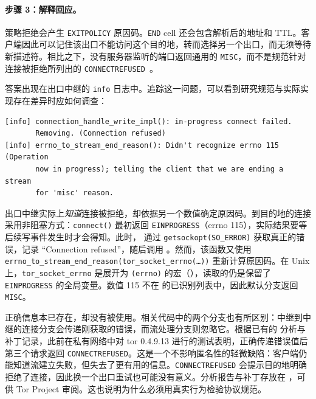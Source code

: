 \paragraph{步骤 3：解释回应。}策略拒绝会产生 \texttt{EXITPOLICY} 原因码。\texttt{END} cell 还会包含解析后的地址和 TTL。客户端因此可以记住该出口不能访问这个目的地，转而选择另一个出口，而无须等待新描述符。相比之下，没有服务器监听的端口返回通用的 \texttt{MISC}，而不是规范针对连接被拒绝所列出的 \texttt{CONNECTREFUSED}~。

\begin{approfondimento}
答案出现在出口中继的 \texttt{info} 日志中。追踪这一问题，可以看到研究规范与实际实现存在差异时应如何调查：
\begin{lstlisting}[numbers=none]
[info] connection_handle_write_impl(): in-progress connect failed.
       Removing. (Connection refused)
[info] errno_to_stream_end_reason(): Didn't recognize errno 115 (Operation
       now in progress); telling the client that we are ending a stream
       for 'misc' reason.
\end{lstlisting}
出口中继实际上\emph{知道}连接被拒绝，却依据另一个数值确定原因码。到目的地的连接采用非阻塞方式：\texttt{connect()} 最初返回 \texttt{EINPROGRESS}（errno 115），实际结果要等后续写事件发生时才会得知。此时， 通过 \texttt{getsockopt(SO\_ERROR)} 获取真正的错误，记录 \enquote{Connection refused}，随后调用 。然而，该函数又使用 \texttt{errno\_to\_stream\_end\_reason(tor\_socket\_errno(\ldots))} 重新计算原因码。在 Unix 上，\texttt{tor\_socket\_errno} 是展开为 \texttt{(errno)} 的宏（），读取的仍是保留了 \texttt{EINPROGRESS} 的全局变量。数值 115 不在  的已识别列表中，因此默认分支返回 \texttt{MISC}。

正确信息本已存在，却没有被使用。相关代码中的两个分支也有所区别：中继到中继的连接分支会传递刚获取的错误，而流处理分支则忽略它。根据已有的  分析与补丁记录，此前在私有网络中对 tor 0.4.9.13 进行的测试表明，正确传递错误值后第三个请求返回 \texttt{CONNECTREFUSED}。这是一个不影响匿名性的轻微缺陷：客户端仍能知道流建立失败，但失去了更有用的信息。\texttt{CONNECTREFUSED} 会提示目的地明确拒绝了连接，因此换一个出口重试也可能没有意义。分析报告与补丁存放在 ，可供 Tor Project 审阅。这也说明为什么必须用真实行为检验协议规范。
\end{approfondimento}

